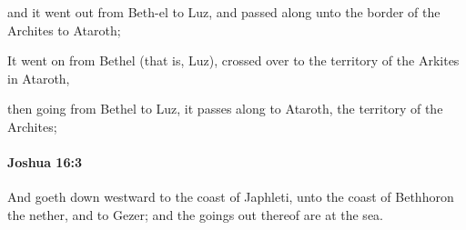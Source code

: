 			\begin{versebox}
					\item[BHS] 
					\item[ASV] and it went out from Beth-el to Luz, and passed along unto the border of the Archites to Ataroth;
					\item[NIV] It went on from Bethel (that is, Luz), crossed over to the territory of the Arkites in Ataroth,
					\item[NRSV] then going from Bethel to Luz, it passes along to Ataroth, the territory of the Archites;
			\end{versebox}

		\paragraph{Joshua 16:3} %
			\label{JOSHUA-16-3}

			And goeth down westward to the coast of Japhleti, unto the coast of Bethhoron the nether, and to Gezer; and the goings out thereof are at the sea.

